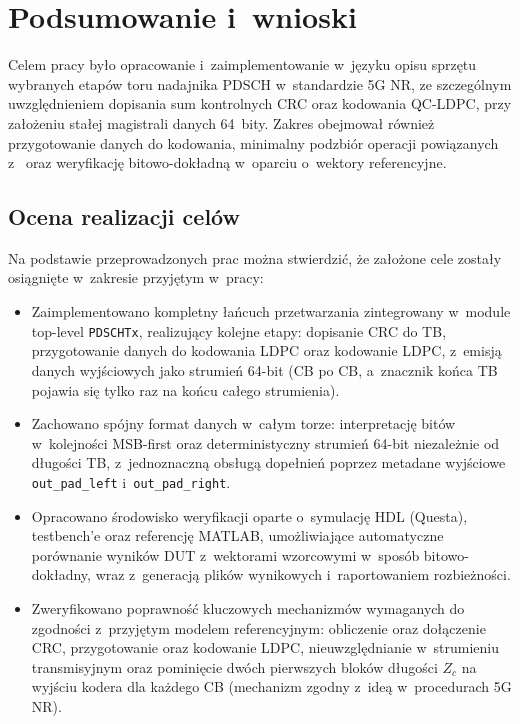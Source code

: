 \chapter{Podsumowanie i~wnioski}

Celem pracy było opracowanie i~zaimplementowanie w~języku opisu sprzętu wybranych etapów toru nadajnika PDSCH w~standardzie 5G NR, ze szczególnym uwzględnieniem dopisania sum kontrolnych CRC oraz kodowania QC-LDPC, przy założeniu stałej magistrali danych 64~bity. Zakres obejmował również przygotowanie danych do kodowania, minimalny podzbiór operacji powiązanych z~ oraz weryfikację bitowo-dokładną w~oparciu o~wektory referencyjne. 

\section*{Ocena realizacji celów}
Na podstawie przeprowadzonych prac można stwierdzić, że założone cele zostały osiągnięte w~zakresie przyjętym w~pracy:

\begin{itemize}
  \item Zaimplementowano kompletny łańcuch przetwarzania zintegrowany w~module top-level \texttt{PDSCHTx}, realizujący kolejne etapy: dopisanie CRC do TB, przygotowanie danych do kodowania LDPC oraz kodowanie LDPC, z~emisją danych wyjściowych jako strumień 64-bit (CB po CB, a~znacznik końca TB pojawia się tylko raz na końcu całego strumienia). 

  \item Zachowano spójny format danych w~całym torze: interpretację bitów w~kolejności MSB-first oraz deterministyczny strumień 64-bit niezależnie od długości TB, z~jednoznaczną obsługą dopełnień poprzez metadane wyjściowe \texttt{out\_pad\_left} i~\texttt{out\_pad\_right}. 

  \item Opracowano środowisko weryfikacji oparte o~symulację HDL (Questa), testbench’e oraz referencję MATLAB, umożliwiające automatyczne porównanie wyników DUT z~wektorami wzorcowymi w~sposób bitowo-dokładny, wraz z~generacją plików wynikowych i~raportowaniem rozbieżności. 

  \item Zweryfikowano poprawność kluczowych mechanizmów wymaganych do zgodności z~przyjętym modelem referencyjnym: obliczenie oraz dołączenie CRC, przygotowanie oraz kodowanie LDPC, nieuwzględnianie  w~strumieniu transmisyjnym oraz pominięcie dwóch pierwszych bloków długości $Z_c$ na wyjściu kodera dla każdego CB (mechanizm zgodny z~ideą  w~procedurach 5G NR). 
\end{itemize}

